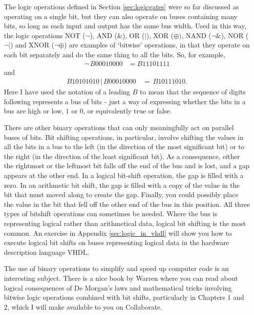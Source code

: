 \documentclass[../physical_computing.tex]{subfiles}
\begin{document}
The logic operations defined in Section \ref{sec:logicgates} were so far discussed as operating on a single bit, but they can also operate on buses containing many bits, so long as each input and output has the same bus width. Used in this way, the logic operations NOT ($\neg$), AND ($\&$), OR ($|$), XOR ($\oplus)$, NAND ($\neg\&$), NOR ($\neg|$) and XNOR ($\neg\oplus$) are examples of `bitwise' operations, in that they operate on each bit separately and do the same thing to all the bits. So, for example,
\begin{align}
    \neg\,B00010000&=B11101111
    \label{eq:first_bus_operation}
\end{align}
 and
\begin{align}
   B10101010\,|\,B00010000\,&=\,B10111010.
   \label{eq:second_bus_operation}
\end{align}
 Here I have used the notation of a leading $B$ to mean that the sequence of digits following represents a bus of bits - just a way of expressing whether the bits in a bus are high or low, $1$ or $0$, or equivalently true or false.
 
 There are other binary operations that can only meaningfully act on parallel buses of bits. Bit shifting operations, in particular, involve shifting the values in all the bits in a bus to the left (in the direction of the most significant bit) or to the right (in the direction of the least significant bit). As a consequence, either the rightmost or the leftmost bit falls off the end of the bus and is lost, and a gap appears at the other end. In a logical bit-shift operation, the gap is filled with a zero. In an arithmetic bit shift, the gap is filled with a copy of the value in the bit that must moved along to create the gap. Finally, you could possibly place the value in the bit that fell off the other end of the bus in this position. All three types of bitshift operations can sometimes be needed. Where the bus is representing logical rather than arithmetical data, logical bit shifting is the most common. An exercise in Appendix \ref{sec:logic_in_vhdl} will show you how to execute logical bit shifts on buses representing logical data in the hardware description language VHDL.
 
 The use of binary operations to simplify and speed up computer code is an interesting subject. There is a nice book by Warren \cite{Warren:10.5555/2462741} where you can read about logical consequences of De Morgan's laws and mathematical tricks involving bitwise logic operations combined with bit shifts, particularly in Chapters 1 and 2, which I will make available to you on Collaborate.
\end{document}
